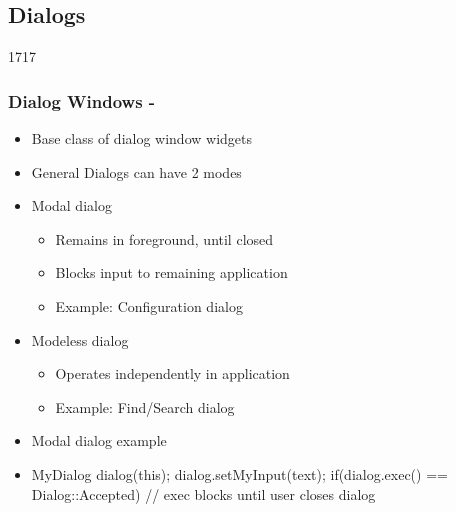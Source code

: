%
%
%
%

\subsection{Dialogs}

\begin{slide}[fragile]{1717}\frametitle{Dialog Windows - }
  \begin{itemize}
  \item Base class of dialog window widgets
  \item General Dialogs can have 2 modes
  \item Modal dialog
  \begin{itemize}
  \item Remains in foreground, until closed
 \item Blocks input to remaining application
 \item Example: Configuration dialog
   \end{itemize}
  \item Modeless dialog
  \begin{itemize}
  \item Operates independently in application
   \item Example: Find/Search dialog
   \end{itemize}
  \end{itemize}
\vfill
 \begin{itemize}
  \item Modal dialog example
 \item[] 
    \begin{cpp}
MyDialog dialog(this);
dialog.setMyInput(text);
if(dialog.exec() == Dialog::Accepted) {
  // exec blocks until user closes dialog
}
    \end{cpp}
  \end{itemize}
\end{slide}

